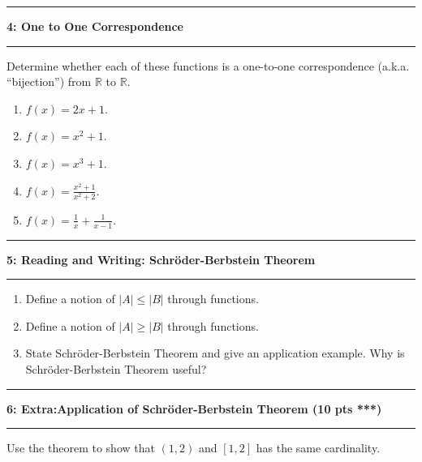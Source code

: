 \documentclass[11pt]{article}
\newcommand\question[2]{\vspace{.25in}\hrule\textbf{#1: #2}\vspace{.5em}\hrule\vspace{.10in}}
\newcommand{\R}{\mathbb{R}}
\begin{document}
\question{4}{One to One Correspondence}
Determine whether each of these functions is a one-to-one correspondence (a.k.a. ``bijection'') from $\R$ to $\R$.
\begin{enumerate}
    \item $f(x)=2x+1$.
    \item $f(x)=x^2+1$.
    \item $f(x)=x^3+1$.
    \item $f(x)=\frac{x^2+1}{x^2+2}$.
    \item $f(x)=\frac{1}{x}+ \frac{1}{x-1}$.
\end{enumerate}

\question{5}{Reading and Writing: Schr\"oder-Berbstein Theorem}
\begin{enumerate}
    \item Define a notion of $|A|\leq |B|$ through functions.
    \item Define a notion of $|A|\geq |B|$ through functions.
    \item State Schr\"oder-Berbstein Theorem and give an application example. Why is Schr\"oder-Berbstein Theorem useful?
\end{enumerate}
\question{6}{Extra:Application of Schr\"oder-Berbstein Theorem (10 pts ***)}
Use the theorem to show that $(1,2)$ and $[1,2]$ has the same cardinality.
\end{document}
